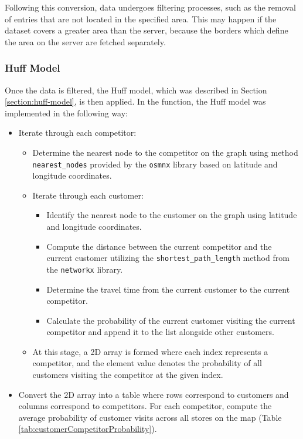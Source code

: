 Following this conversion, data undergoes filtering processes, such as the removal of entries that are not located in the specified area. This may happen if the dataset covers a greater area than the server, because the borders which define the area on the server are fetched separately.

\subsubsection{Huff Model}

Once the data is filtered, the Huff model, which was described in Section \ref{section:huff-model}, is then applied. In the function, the Huff model was implemented in the following way:

\begin{itemize}
    \item Iterate through each competitor:
    \begin{itemize}
        \item Determine the nearest node to the competitor on the graph using method \\ \texttt{nearest\_nodes} provided by the \texttt{osmnx} library based on latitude and longitude coordinates.
        \item Iterate through each customer:
        \begin{itemize}
            \item Identify the nearest node to the customer on the graph using latitude and longitude coordinates.
            \item Compute the distance between the current competitor and the current customer utilizing the \texttt{shortest\_path\_length} method from the \texttt{networkx} library.
            \item Determine the travel time from the current customer to the current competitor.
            \item Calculate the probability of the current customer visiting the current competitor and append it to the list alongside other customers.
        \end{itemize}
        \item At this stage, a 2D array is formed where each index represents a competitor, and the element value denotes the probability of all customers visiting the competitor at the given index.
    \end{itemize}
    \item Convert the 2D array into a table where rows correspond to customers and columns correspond to competitors. For each competitor, compute the average probability of customer visits across all stores on the map (Table \ref{tab:customerCompetitorProbability}).
\end{itemize}


